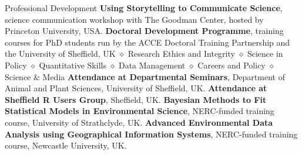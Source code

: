 \begin{rubric}{Professional Development}
\entry*[2020] \textbf{Using Storytelling to Communicate Science}, science communication workshop with The Goodman Center, hosted by Princeton University, USA.
\entry*[2014 -- 2018] \textbf{Doctoral Development
Programme}, training courses for PhD students run by the ACCE Doctoral Training Partnership and the University of Sheffield, UK $\diamond$ Research Ethics and Integrity $\diamond$ Science in Policy $\diamond$ Quantitative Skills $\diamond$ Data Management $\diamond$ Careers and Policy $\diamond$ Science \& Media
\entry*[2014 -- 2018] \textbf{Attendance at Departmental Seminars}, Department of Animal and Plant Sciences, University of Sheffield, UK.
\entry*[2014 -- 2018] \textbf{Attendance at Sheffield R Users Group}, Sheffield, UK.
\entry*[2016] \textbf{Bayesian Methods to Fit Statistical Models in
Environmental Science}, NERC-funded training course, University of Strathclyde, UK.
\entry*[2015] \textbf{Advanced Environmental Data Analysis using
Geographical Information Systems}, NERC-funded training course, Newcastle University, UK.

\end{rubric}